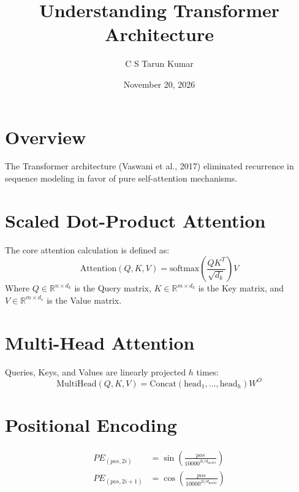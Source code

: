 \documentclass[11pt,a4paper]{article}
\title{\textbf{Understanding Transformer Architecture}}
\author{C S Tarun Kumar}
\date{November 20, 2026}
\begin{document}
\maketitle

\section{Overview}
The Transformer architecture (Vaswani et al., 2017) eliminated recurrence in sequence modeling in favor of pure self-attention mechanisms.

\section{Scaled Dot-Product Attention}
The core attention calculation is defined as:
\begin{equation}
\text{Attention}(Q, K, V) = \text{softmax}\left(\frac{QK^T}{\sqrt{d_k}}\right)V
\end{equation}
Where $Q \in \mathbb{R}^{n \times d_k}$ is the Query matrix, $K \in \mathbb{R}^{m \times d_k}$ is the Key matrix, and $V \in \mathbb{R}^{m \times d_v}$ is the Value matrix.

\section{Multi-Head Attention}
Queries, Keys, and Values are linearly projected $h$ times:
\begin{equation}
\text{MultiHead}(Q, K, V) = \text{Concat}(\text{head}_1, \dots, \text{head}_h)W^O
\end{equation}

\section{Positional Encoding}
\begin{align}
PE_{(pos, 2i)} &= \sin\left(\frac{pos}{10000^{2i/d_{\text{model}}}}\right) \\
PE_{(pos, 2i+1)} &= \cos\left(\frac{pos}{10000^{2i/d_{\text{model}}}}\right)
\end{align}
\end{document}
